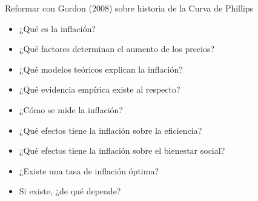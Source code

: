 \documentclass{nuevotema}
\begin{document}
\ideaclave

Reformar con Gordon (2008) sobre historia de la Curva de Phillips


\begin{itemize}
	\item ¿Qué es la inflación?
	\item ¿Qué factores determinan el aumento de los precios?
	\item ¿Qué modelos teóricos explican la inflación?
	\item ¿Qué evidencia empírica existe al respecto?
	\item ¿Cómo se mide la inflación?
	\item ¿Qué efectos tiene la inflación sobre la eficiencia?
	\item ¿Qué efectos tiene la inflación sobre el bienestar social?
	\item ¿Existe una tasa de inflación óptima?
	\item Si existe, ¿de qué depende?
\end{itemize}

\esquemacorto
\end{document}
